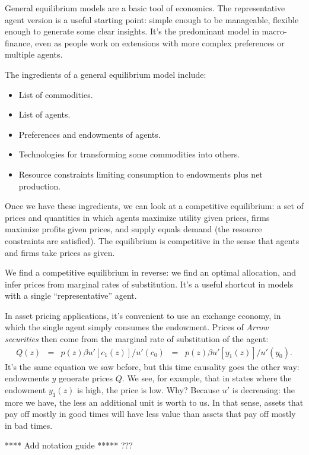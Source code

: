 \documentclass[11pt]{article}
\begin{document}
General equilibrium models are a basic tool of economics.
The representative agent version is a useful starting point:
simple enough to be manageable, flexible enough to generate some clear insights.
It's the predominant model in macro-finance,
even as people work on extensions with more complex preferences
or multiple agents.

The ingredients of a general equilibrium model include:
\begin{itemize}
\item List of commodities.
\item List of agents.
\item Preferences and endowments of agents.
\item Technologies for transforming some commodities into others.
\item Resource constraints limiting consumption to endowments plus net production.
\end{itemize}
Once we have these ingredients, we can
look at a competitive equilibrium:
a set of prices and quantities in which
agents maximize utility given prices,
firms maximize profits given prices,
and supply equals demand (the resource constraints are satisfied).
The equilibrium is competitive in the sense that agents and firms
take prices as given.

We find a competitive equilibrium in reverse:
we find an optimal allocation, and infer prices from
marginal rates of substitution.
It's a useful shortcut in models with a single ``representative'' agent.

In asset pricing applications, it's convenient
to use an exchange economy, in which the single agent simply consumes
the endowment.
Prices of {\it Arrow securities\/} then come from the marginal rate of substitution
of the agent:
\begin{eqnarray*}
    Q(z) &=& p(z) \beta u'[c_1(z)]/u'(c_0) \;\;=\;\; p(z) \beta u'[y_1(z)]/u'(y_0) .
\end{eqnarray*}
It's the same equation we saw before, but this time causality goes the
other way:  endowments $y$ generate prices $Q$.
We see, for example, that in states where the endowment $y_1(z)$ is high,
the price is low.
Why?  Because $u'$ is decreasing:  the more we have, the less an additional
unit is worth to us.
In that sense, assets that pay off mostly in good times will have less value
than assets that pay off mostly in bad times.

**** Add notation guide ***** ???


\end{document}
